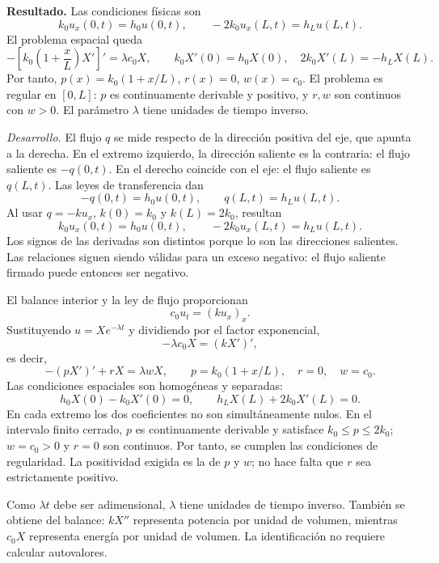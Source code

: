 \noindent\textbf{Resultado.} Las condiciones físicas son
\[
k_0u_x(0,t)=h_0u(0,t),\qquad
-2k_0u_x(L,t)=h_Lu(L,t).
\]
El problema espacial queda
\[
-\left[k_0\left(1+\frac{x}{L}\right)X'\right]'=\lambda c_0X,
\qquad k_0X'(0)=h_0X(0),\quad
2k_0X'(L)=-h_LX(L).
\]
Por tanto, \(p(x)=k_0(1+x/L)\), \(r(x)=0\), \(w(x)=c_0\). El problema es regular en \([0,L]\): \(p\) es continuamente derivable y positivo, y \(r,w\) son continuos con \(w>0\). El parámetro \(\lambda\) tiene unidades de tiempo inverso.

\noindent\textit{Desarrollo.} El flujo \(q\) se mide respecto de la dirección positiva del eje, que apunta a la derecha. En el extremo izquierdo, la dirección saliente es la contraria: el flujo saliente es \(-q(0,t)\). En el derecho coincide con el eje: el flujo saliente es \(q(L,t)\). Las leyes de transferencia dan
\[
-q(0,t)=h_0u(0,t),\qquad q(L,t)=h_Lu(L,t).
\]
Al usar \(q=-ku_x\), \(k(0)=k_0\) y \(k(L)=2k_0\), resultan
\[
k_0u_x(0,t)=h_0u(0,t),\qquad
-2k_0u_x(L,t)=h_Lu(L,t).
\]
Los signos de las derivadas son distintos porque lo son las direcciones salientes. Las relaciones siguen siendo válidas para un exceso negativo: el flujo saliente firmado puede entonces ser negativo.

El balance interior y la ley de flujo proporcionan
\[
c_0u_t=(ku_x)_x.
\]
Sustituyendo \(u=Xe^{-\lambda t}\) y dividiendo por el factor exponencial,
\[
-\lambda c_0X=(kX')',
\]
es decir,
\[
-(pX')'+rX=\lambda wX,
\qquad p=k_0(1+x/L),\quad r=0,\quad w=c_0.
\]
Las condiciones espaciales son homogéneas y separadas:
\[
h_0X(0)-k_0X'(0)=0,\qquad
h_LX(L)+2k_0X'(L)=0.
\]
En cada extremo los dos coeficientes no son simultáneamente nulos. En el intervalo finito cerrado, \(p\) es continuamente derivable y satisface \(k_0\le p\le2k_0\); \(w=c_0>0\) y \(r=0\) son continuos. Por tanto, se cumplen las condiciones de regularidad. La positividad exigida es la de \(p\) y \(w\); no hace falta que \(r\) sea estrictamente positivo.

Como \(\lambda t\) debe ser adimensional, \(\lambda\) tiene unidades de tiempo inverso. También se obtiene del balance: \(kX''\) representa potencia por unidad de volumen, mientras \(c_0X\) representa energía por unidad de volumen. La identificación no requiere calcular autovalores.
